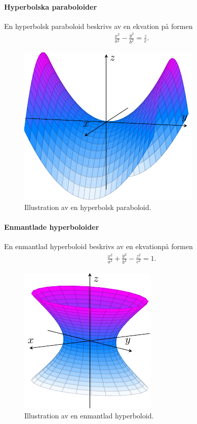 \paragraph{Hyperbolska paraboloider}
En hyperbolsk paraboloid beskrivs av en ekvation på formen
\begin{align*}
	\frac{x^2}{a^2} - \frac{y^2}{b^2} = \frac{z}{c}.
\end{align*}

\begin{figure}[!ht]
	\centering
	\includegraphics[scale=1]{./Images/quadric_surfaces/hyperbolic_paraboloid/hyperbolic_paraboloid.pdf}
	\caption{Illustration av en hyperbolsk paraboloid.}
	\label{fig:hyperbolic_paraboloid}
\end{figure}

\paragraph{Enmantlade hyperboloider}
En enmantlad hyperboloid beskrivs av en ekvationpå formen
\begin{align*}
	\frac{x^2}{a^2} + \frac{y^2}{b^2} - \frac{z^2}{c^2} = 1.
\end{align*}
\begin{figure}[!ht]
	\centering
	\includegraphics[scale=1]{./Images/quadric_surfaces/one_sheet_hyperboloid/one_sheet_hyperboloid.pdf}
	\caption{Illustration av en enmantlad hyperboloid.}
	\label{fig:one_sheet_hyperboloid}
\end{figure}

